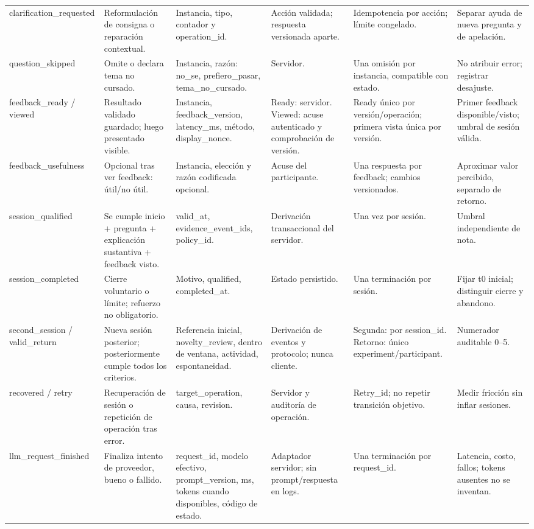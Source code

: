 \documentclass[11pt,a4paper]{report}
\begin{document}
\begin{landscape}
\begin{longtable}{P{3.4cm}P{4.2cm}P{4.3cm}P{3.7cm}P{4.6cm}P{3.2cm}}
clarification\_requested & Reformulación de consigna o reparación contextual. & Instancia, tipo, contador y operation\_id. & Acción validada; respuesta versionada aparte. & Idempotencia por acción; límite congelado. & Separar ayuda de nueva pregunta y de apelación.\\
question\_skipped & Omite o declara tema no cursado. & Instancia, razón: no\_se, prefiero\_pasar, tema\_no\_cursado. & Servidor. & Una omisión por instancia, compatible con estado. & No atribuir error; registrar desajuste.\\
feedback\_ready / viewed & Resultado validado guardado; luego presentado visible. & Instancia, feedback\_version, latency\_ms, método, display\_nonce. & Ready: servidor. Viewed: acuse autenticado y comprobación de versión. & Ready único por versión/operación; primera vista única por versión. & Primer feedback disponible/visto; umbral de sesión válida.\\
feedback\_usefulness & Opcional tras ver feedback: útil/no útil. & Instancia, elección y razón codificada opcional. & Acuse del participante. & Una respuesta por feedback; cambios versionados. & Aproximar valor percibido, separado de retorno.\\
session\_qualified & Se cumple inicio + pregunta + explicación sustantiva + feedback visto. & valid\_at, evidence\_event\_ids, policy\_id. & Derivación transaccional del servidor. & Una vez por sesión. & Umbral independiente de nota.\\
session\_completed & Cierre voluntario o límite; refuerzo no obligatorio. & Motivo, qualified, completed\_at. & Estado persistido. & Una terminación por sesión. & Fijar t0 inicial; distinguir cierre y abandono.\\
second\_session / valid\_return & Nueva sesión posterior; posteriormente cumple todos los criterios. & Referencia inicial, novelty\_review, dentro de ventana, actividad, espontaneidad. & Derivación de eventos y protocolo; nunca cliente. & Segunda: por session\_id. Retorno: único experiment/participant. & Numerador auditable 0--5.\\
recovered / retry & Recuperación de sesión o repetición de operación tras error. & target\_operation, causa, revision. & Servidor y auditoría de operación. & Retry\_id; no repetir transición objetivo. & Medir fricción sin inflar sesiones.\\
llm\_request\_finished & Finaliza intento de proveedor, bueno o fallido. & request\_id, modelo efectivo, prompt\_version, ms, tokens cuando disponibles, código de estado. & Adaptador servidor; sin prompt/respuesta en logs. & Una terminación por request\_id. & Latencia, costo, fallos; tokens ausentes no se inventan.\\

\end{longtable}
\end{landscape}
\end{document}
